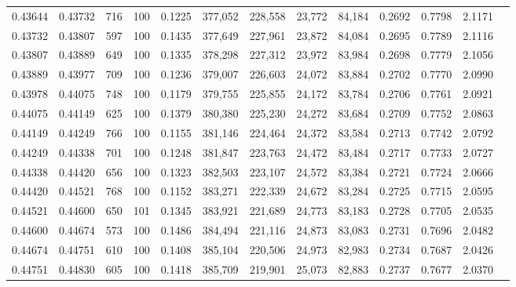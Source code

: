 \begin{tabular}{rrrrrrrrrrrrr}
0.43644 & 0.43732 &   716 & 100 &                                     0.1225 & 377,052 & 228,558 &  23,772 &  84,184 & 0.2692 & 0.7798 & 2.1171 \\
0.43732 & 0.43807 &   597 & 100 &                                     0.1435 & 377,649 & 227,961 &  23,872 &  84,084 & 0.2695 & 0.7789 & 2.1116 \\
0.43807 & 0.43889 &   649 & 100 &                                     0.1335 & 378,298 & 227,312 &  23,972 &  83,984 & 0.2698 & 0.7779 & 2.1056 \\
0.43889 & 0.43977 &   709 & 100 &                                     0.1236 & 379,007 & 226,603 &  24,072 &  83,884 & 0.2702 & 0.7770 & 2.0990 \\
0.43978 & 0.44075 &   748 & 100 &                                     0.1179 & 379,755 & 225,855 &  24,172 &  83,784 & 0.2706 & 0.7761 & 2.0921 \\
0.44075 & 0.44149 &   625 & 100 &                                     0.1379 & 380,380 & 225,230 &  24,272 &  83,684 & 0.2709 & 0.7752 & 2.0863 \\
0.44149 & 0.44249 &   766 & 100 &                                     0.1155 & 381,146 & 224,464 &  24,372 &  83,584 & 0.2713 & 0.7742 & 2.0792 \\
0.44249 & 0.44338 &   701 & 100 &                                     0.1248 & 381,847 & 223,763 &  24,472 &  83,484 & 0.2717 & 0.7733 & 2.0727 \\
0.44338 & 0.44420 &   656 & 100 &                                     0.1323 & 382,503 & 223,107 &  24,572 &  83,384 & 0.2721 & 0.7724 & 2.0666 \\
0.44420 & 0.44521 &   768 & 100 &                                     0.1152 & 383,271 & 222,339 &  24,672 &  83,284 & 0.2725 & 0.7715 & 2.0595 \\
0.44521 & 0.44600 &   650 & 101 &                                     0.1345 & 383,921 & 221,689 &  24,773 &  83,183 & 0.2728 & 0.7705 & 2.0535 \\
0.44600 & 0.44674 &   573 & 100 &                                     0.1486 & 384,494 & 221,116 &  24,873 &  83,083 & 0.2731 & 0.7696 & 2.0482 \\
0.44674 & 0.44751 &   610 & 100 &                                     0.1408 & 385,104 & 220,506 &  24,973 &  82,983 & 0.2734 & 0.7687 & 2.0426 \\
0.44751 & 0.44830 &   605 & 100 &                                     0.1418 & 385,709 & 219,901 &  25,073 &  82,883 & 0.2737 & 0.7677 & 2.0370 \\

\end{tabular}
